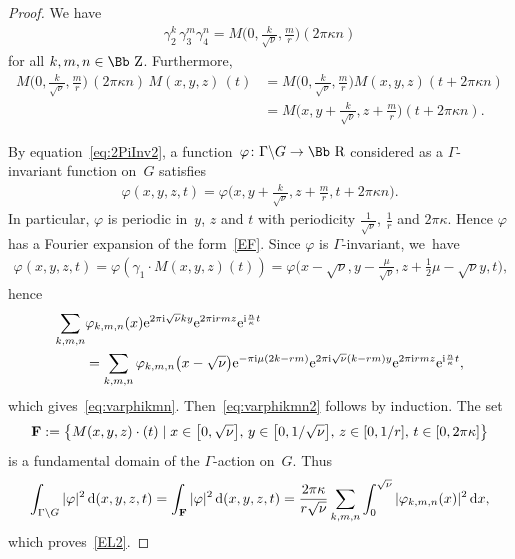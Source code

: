 \documentclass[10pt,a4paper]{amsart}
\newcommand\RR{{\mbox{\Bb R}}}
\newcommand\ZZ{{\mbox{\Bb Z}}}
\newcommand\bF{\textbf{{\rm \textbf{F}}}}
\newcommand\ph{\varphi}
\numberwithin{equation}{section}
\begin{document}
\begin{proof}
We have
\begin{gather*}
\gamma_2^{k} \,\gamma_3^{m}\gamma_4^{n} =M\bigg(0,\frac{k}{\sqrt\nu},\frac{m}{r}\bigg)(2\pi \kappa n)
\end{gather*}
for all $k,m,n\in\ZZ$.
Furthermore,
\begin{align}
M\bigg(0,\frac{k}{\sqrt\nu},\frac{m}{r}\bigg)\,(2\pi \kappa n)\, M(x,y,z)\,(t)
&=M\bigg(0,\frac{k}{\sqrt\nu},\frac{m}{r}\bigg)M(x,y,z)(t+2\pi\kappa n)\nonumber
\\
&=M\bigg(x,y+\frac{k}{\sqrt\nu},z+\frac{m}{r}\bigg)(t+2\pi \kappa n)\label{eq:2PiInv2}.
\end{align}

By equation~\eqref{eq:2PiInv2}, a function~$\varphi\colon \Gamma\backslash G\rightarrow\RR$ considered as a $\Gamma$-invariant function on~$G$ satisfies
\begin{gather*}
\varphi(x,y,z,t)=\varphi\bigg(x,y+\frac{k}{\sqrt\nu},z+\frac{m}r,t+2\pi \kappa n\bigg).
\end{gather*}
In particular, $\varphi$ is periodic in~$y$, $z$ and $t$ with periodicity $\frac{1}{\sqrt\nu}$, $\frac{1}{r}$ and $2\pi\kappa$.
Hence $\varphi$ has a Fourier expansion of the form~\eqref{EF}.
Since $\varphi$ is $\Gamma$-invariant, we~have
\begin{gather*}
\ph(x,y,z,t)=\ph(\gamma_1\cdot M(x,y,z)(t))=\ph\bigg(x-\sqrt\nu,y-\frac\mu{\sqrt\nu}, z+\frac12\mu-\sqrt\nu y,t\bigg),
\end{gather*}
hence
\begin{align*}
\sum_{k,m,n}&\varphi_{k,m,n}(x){\rm e}^{2\pi {\rm i}\sqrt\nu ky}{\rm e}^{2\pi {\rm i}rmz}{\rm e}^{{\rm i} \frac n \kappa t}\\
&=\sum_{k,m,n}\varphi_{k,m,n}\big(x-\sqrt\nu\big){\rm e}^{-\pi {\rm i}\mu (2k-rm)}{\rm e}^{2\pi {\rm i}\sqrt\nu (k-rm)y} {\rm e}^{2\pi {\rm i}rmz} {\rm e}^{{\rm i} \frac n\kappa t},
\end{align*}
which gives~\eqref{eq:varphikmn}. Then~\eqref{eq:varphikmn2} follows by induction.
The set
\begin{gather*}
\bF:=\big\{M(x,y,z)\cdot(t) \mid x\in \big[0,\sqrt\nu\big],\, y\in\big[0,1/\sqrt\nu\big],\, z\in[0,1/r],\, t\in[0,2\pi\kappa]\big\}
\end{gather*}
is a fundamental domain of the $\Gamma$-action on~$G$. Thus
\begin{gather*}
\int_{\Gamma\backslash G} |\varphi|^2 \,{\rm d}(x,y,z,t) =\int_{\bF} |\varphi|^2 \,{\rm d}(x,y,z,t)=\frac{2\pi \kappa}{r\sqrt\nu}\sum_{k,m,n}\int_0^{\sqrt\nu}|\varphi_{k,m,n}(x)|^2\,{\rm d}x,
\end{gather*}
which proves~\eqref{EL2}.
\end{proof}
\end{document}
